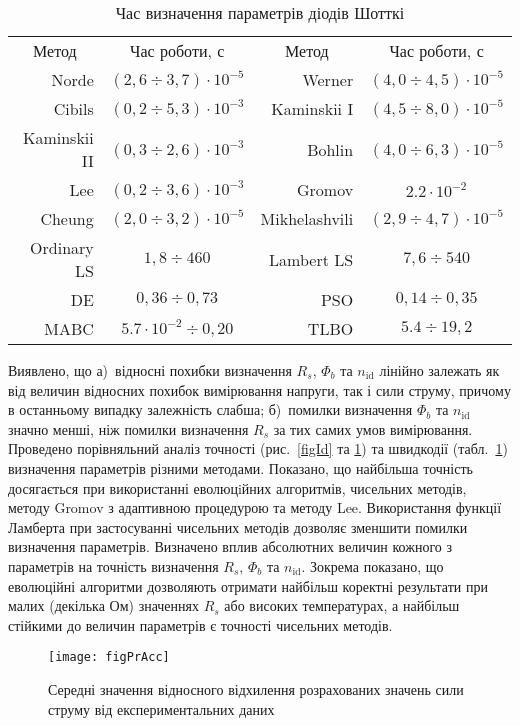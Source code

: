 \begin{table}[t]
\caption{\label{tabRT}Час визначення параметрів діодів Шотткі}
\centering
\begin{tabular}{|r|c|r|c|}
\hline
\multicolumn{1}{|c|}{Метод}&Час роботи, с &\multicolumn{1}{c|}{Метод}&Час роботи, с\\ \hhline{|====|}
Norde &$(2,6\div3,7)\cdot10^{-5}$& Werner  &$(4,0\div4,5)\cdot10^{-5}$\\ \hline
Cibils  &$(0,2\div5,3)\cdot10^{-3}$& Kaminskii I &$(4,5\div8,0)\cdot10^{-5}$\\ \hline
Kaminskii II &$(0,3\div2,6)\cdot10^{-3}$& Bohlin &$(4,0\div6,3)\cdot10^{-5}$\\ \hline
Lee &$(0,2\div3,6)\cdot10^{-3}$& Gromov &$2.2\cdot10^{-2}$\\ \hline
Cheung &$(2,0\div3,2)\cdot10^{-5}$&Mikhelashvili &$(2,9\div4,7)\cdot10^{-5}$\\ \hline
Ordinary LS &$1,8\div460$&Lambert LS &$7,6\div540$\\ \hline
DE &$0,36\div0,73$&PSO &$0,14\div0,35$\\ \hline
MABC &$5.7\cdot10^{-2}\div0,20$&TLBO &$5.4\div19,2$ \\
\hline
\end{tabular}
\end{table}

Виявлено, що
а)~відносні похибки визначення $R_s$, $\Phi_b$ та $n_\mathrm{id}$ лінійно залежать як від величин відносних похибок вимірювання напруги, так і сили струму, причому в останньому випадку залежність слабша;
б)~помилки визначення $\Phi_b$ та $n_\mathrm{id}$ значно менші, ніж помилки визначення $R_s$ за тих самих умов вимірювання.
Проведено порівняльний аналіз точності (рис.~\ref{figId} та \ref{figPrAcc}) та швидкодії (табл.~\ref{tabRT}) визначення параметрів різними методами.
Показано, що найбільша точність досягається при використанні еволюцiйних алгоритмів, чисельних методів, методу Gromov з адаптивною процедурою та методу Lee.
Використання функції Ламберта при застосуванні чисельних методів дозволяє зменшити помилки визначення параметрів.
Визначено вплив абсолютних величин кожного з параметрів на точність визначення $R_s$, $\Phi_b$ та $n_\mathrm{id}$.
Зокрема показано, що еволюційні алгоритми дозволяють отримати найбільш коректні результати при малих (декілька Ом) значеннях $R_s$ або високих температурах, а найбільш стійкими до величин параметрів є точності чисельних методів.
\begin{figure}[h]
\center
\texttt{[image: figPrAcc]}%
\caption{\label{figPrAcc}
Середні значення відносного відхилення розрахованих значень сили струму від експериментальних даних
}
\end{figure}

